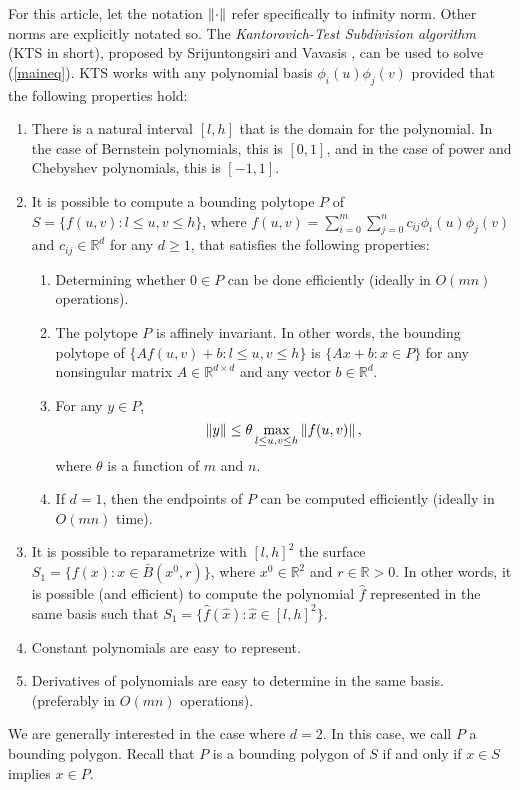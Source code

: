 \documentclass[12pt]{article}
\begin{document}
For this article, let the
notation $\left\|\cdot\right\|$ refer specifically to infinity
norm.  Other norms are explicitly notated so.
The \emph{Kantorovich-Test Subdivision algorithm} (KTS
in short), proposed by Srijuntongsiri and Vavasis \cite{srijuntongsiri_lsi},
can be used to solve (\ref{maineq}).
KTS works with any polynomial basis $\phi_i(u)\phi_j(v)$
provided that the following properties hold:
\begin{enumerate}
\item There is a natural interval $[l,h]$ that is the domain for the polynomial.
In the case of Bernstein polynomials, this is $[0,1]$, and in the case of power and
Chebyshev polynomials, this is $[-1,1]$.

\item It is possible to compute a bounding polytope $P$ of $S =
\{f(u,v) : l \leq u,v \leq h \}$, where $f(u,v) = \sum_{i=0}^m
\sum_{j=0}^n c_{ij} \phi_i(u)\phi_j(v)$ and $c_{ij} \in
\mathbb{R}^d$ for any $d \geq 1$, that satisfies the following
properties: \label{bounding_prop}
\begin{enumerate}
\item Determining whether $0 \in P$ can be done efficiently
(ideally in $O(mn)$ operations).

\item The polytope $P$ is affinely invariant. In other words,
the bounding polytope of $\{Af(u,v)+b: l \leq u,v \leq h\}$
 is $\{Ax+b : x \in P \}$ for any nonsingular matrix
$A \in \mathbb{R}^{d \times d}$ and any vector $b \in \mathbb{R}^d$.

\item For any $y \in P$,
\begin{equation}
\left\|y\right\| \leq \theta\max_{l \leq u,v \leq h} \left\| f(u,v) \right\|,
\label{thetadef}
\end{equation}
where $\theta$ is a function of $m$ and $n$.
\label{prop_theta}

\item If $d=1$, then the endpoints of $P$ can be computed efficiently (ideally in $O(mn)$ time).
\label{prop_endpoint}
\end{enumerate}

\item It is possible to reparametrize with $[l,h]^2$ the surface
$S_1 = \{ f(x) : x \in \bar{B}(x^0,r) \}$, where $x^0 \in \mathbb{R}^2$ and $r \in \mathbb{R} > 0$.
In other words, it is possible (and efficient) to compute the polynomial
$\hat{f}$ represented in the same basis such that $S_1=\{\hat f(\hat x): \hat x \in [l,h]^2\}$.

\item Constant polynomials are easy to represent. \label{constant_poly_easy}

\item Derivatives of polynomials are easy to determine in the same basis. (preferably in $O(mn)$ operations).
\label{prop_deriv}
\end{enumerate}
We are generally interested in the case where $d=2$.  In this case, we call $P$ a bounding polygon.  Recall that $P$
is a bounding polygon of $S$ if and only if $x \in S$ implies $x
\in P$.
\end{document}
